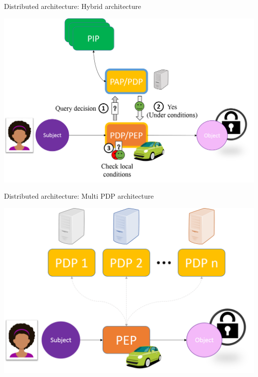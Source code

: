 \begin{frame}{Distributed architecture: Hybrid architecture}
    \begin{center}
        \includegraphics[scale=0.35]{Figures/hybrid_archi.png}
    \end{center}    
\end{frame}


\begin{frame}{Distributed architecture: Multi PDP architecture}
    \begin{center}
        \includegraphics[scale=0.4]{Figures/multiPDP_archi.png}
    \end{center}    
\end{frame}



